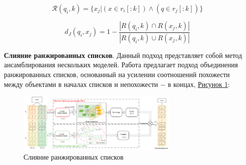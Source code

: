  \begin{equation}
     \mathcal R (q_i, k) = \{ x_j | (x \in r_i[:k]) \wedge (q \in r_j[:k]) \}
 \end{equation}

 \begin{equation}
     d_{J} (q_i, x_j) = 1 - \frac{| R(q_i, k) \cap R(x_j, k) |}{| R(q_i, k) \cup R(x_j, k)  |}
 \end{equation}

 \textbf{Слияние ранжированных списков}. Данный подход представляет собой метод ансамблирования нескольких моделей. Работа \cite{ye2016person} предлагает подход объединения ранжированных списков, основанный на усилении соотношений похожести между объектами в началах списков и непохожести $-$ в концах, \hyperref[fig:rank_fusion]{Рисунок \ref*{fig:rank_fusion}}:

 \begin{figure}[ht]
     \centering
     \includegraphics[width=0.7\textwidth]{images/closed_world/rank_fusion.png}
     \caption{Слияние ранжированных списков \cite{ye2016person}}
     \label{fig:rank_fusion}
 \end{figure}



 \endinput